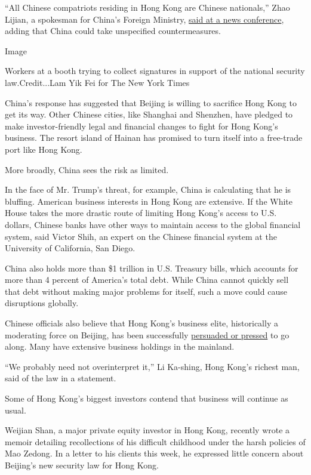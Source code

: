 ``All Chinese compatriots residing in Hong Kong are Chinese nationals,''
Zhao Lijian, a spokesman for China's Foreign Ministry,
\href{https://www.fmprc.gov.cn/mfa_eng/xwfw_665399/s2510_665401/2511_665403/t1784166.shtml}{said
at a news conference}, adding that China could take unspecified
countermeasures.

Image

Workers at a booth trying to collect signatures in support of the
national security law.Credit...Lam Yik Fei for The New York Times

China's response has suggested that Beijing is willing to sacrifice Hong
Kong to get its way. Other Chinese cities, like Shanghai and Shenzhen,
have pledged to make investor-friendly legal and financial changes to
fight for Hong Kong's business. The resort island of Hainan has promised
to turn itself into a free-trade port like Hong Kong.

More broadly, China sees the risk as limited.

In the face of Mr. Trump's threat, for example, China is calculating
that he is bluffing. American business interests in Hong Kong are
extensive. If the White House takes the more drastic route of limiting
Hong Kong's access to U.S. dollars, Chinese banks have other ways to
maintain access to the global financial system, said Victor Shih, an
expert on the Chinese financial system at the University of California,
San Diego.

China also holds more than \$1 trillion in U.S. Treasury bills, which
accounts for more than 4 percent of America's total debt. While China
cannot quickly sell that debt without making major problems for itself,
such a move could cause disruptions globally.

Chinese officials also believe that Hong Kong's business elite,
historically a moderating force on Beijing, has been successfully
\href{https://www.nytimes3xbfgragh.onion/2020/05/31/business/hong-kong-china-business.html}{persuaded
or pressed} to go along. Many have extensive business holdings in the
mainland.

``We probably need not overinterpret it,'' Li Ka-shing, Hong Kong's
richest man, said of the law in a statement.

Some of Hong Kong's biggest investors contend that business will
continue as usual.

Weijian Shan, a major private equity investor in Hong Kong, recently
wrote a memoir detailing recollections of his difficult childhood under
the harsh policies of Mao Zedong. In a letter to his clients this week,
he expressed little concern about Beijing's new security law for Hong
Kong.

